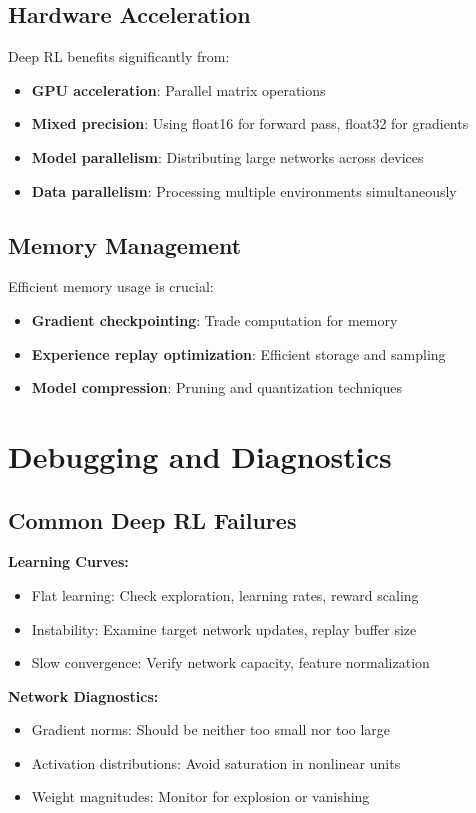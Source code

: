 \subsection{Hardware Acceleration}

Deep RL benefits significantly from:
\begin{itemize}
\item \textbf{GPU acceleration}: Parallel matrix operations
\item \textbf{Mixed precision}: Using float16 for forward pass, float32 for gradients
\item \textbf{Model parallelism}: Distributing large networks across devices
\item \textbf{Data parallelism}: Processing multiple environments simultaneously
\end{itemize}

\subsection{Memory Management}

Efficient memory usage is crucial:
\begin{itemize}
\item \textbf{Gradient checkpointing}: Trade computation for memory
\item \textbf{Experience replay optimization}: Efficient storage and sampling
\item \textbf{Model compression}: Pruning and quantization techniques
\end{itemize}

\section{Debugging and Diagnostics}

\subsection{Common Deep RL Failures}

\begin{examplebox}
\textbf{Learning Curves:}
\begin{itemize}
\item Flat learning: Check exploration, learning rates, reward scaling
\item Instability: Examine target network updates, replay buffer size
\item Slow convergence: Verify network capacity, feature normalization
\end{itemize}

\textbf{Network Diagnostics:}
\begin{itemize}
\item Gradient norms: Should be neither too small nor too large
\item Activation distributions: Avoid saturation in nonlinear units
\item Weight magnitudes: Monitor for explosion or vanishing
\end{itemize}
\end{examplebox}

